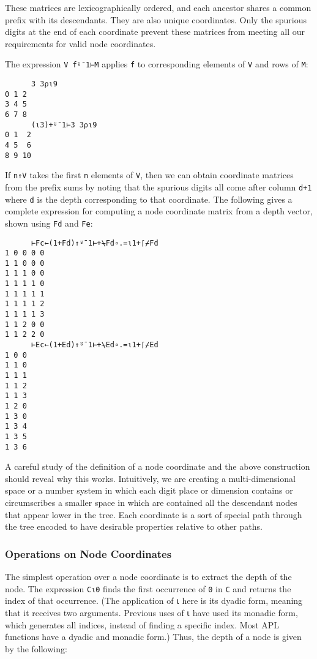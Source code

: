 \documentclass[numbers,preprint]{sigplanconf}
\begin{document}
These matrices are lexicographically ordered, and each ancestor
shares a common prefix with its descendants. They are also unique
coordinates. Only the spurious digits at the end of each coordinate
prevent these matrices from meeting all our requirements for valid
node coordinates.

The expression \verb;V f⍤¯1⊢M; applies \verb;f; to corresponding elements of
\verb;V; and rows of \verb;M;:

\begin{verbatim}
      3 3⍴⍳9
0 1 2
3 4 5
6 7 8
      (⍳3)+⍤¯1⊢3 3⍴⍳9
0 1  2
4 5  6
8 9 10
\end{verbatim}

If \verb;n↑V; takes the first \verb;n; elements of \verb;V;, then we can obtain coordinate
matrices from the prefix sums by noting that the spurious digits
all come after column \verb;d+1; where \verb;d; is the depth corresponding to that
coordinate. The following gives a complete expression for computing
a node coordinate matrix from a depth vector, shown using \verb;Fd; and \verb;Fe;:

\begin{verbatim}
      ⊢Fc←(1+Fd)↑⍤¯1⊢+⍀Fd∘.=⍳1+⌈⌿Fd
1 0 0 0 0
1 1 0 0 0
1 1 1 0 0
1 1 1 1 0
1 1 1 1 1
1 1 1 1 2
1 1 1 1 3
1 1 2 0 0
1 1 2 2 0
      ⊢Ec←(1+Ed)↑⍤¯1⊢+⍀Ed∘.=⍳1+⌈⌿Ed
1 0 0
1 1 0
1 1 1
1 1 2
1 1 3
1 2 0
1 3 0
1 3 4
1 3 5
1 3 6
\end{verbatim}

A careful study of the definition of a node coordinate and the
above construction should reveal why this works. Intuitively, we are
creating a multi-dimensional space or a number system in which each
digit place or dimension contains or circumscribes a smaller space
in which are contained all the descendant nodes that appear lower in
the tree. Each coordinate is a sort of special path through the tree
encoded to have desirable properties relative to other paths.

\subsubsection{Operations on Node Coordinates}

The simplest operation over a node coordinate is to extract the depth
of the node. The expression \verb;C⍳0; finds the first occurrence of \verb;0; in \verb;C;
and returns the index of that occurrence. (The application of ⍳ here
is its dyadic form, meaning that it receives two arguments. Previous
uses of ⍳ have used its monadic form, which generates all indices,
instead of finding a specific index. Most APL functions have a
dyadic and monadic form.)  Thus, the depth of a node is given by
the following:
\end{document}
